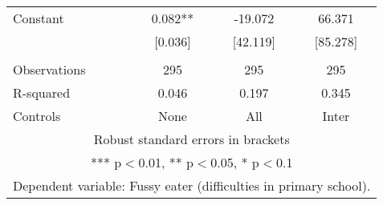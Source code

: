 \begin{tabular}{lccc}
Constant & 0.082** & -19.072 & 66.371 \\
 & [0.036] & [42.119] & [85.278] \\
 &  &  &  \\
Observations & 295 & 295 & 295 \\
R-squared & 0.046 & 0.197 & 0.345 \\
 Controls & None & All & Inter \\ \hline
\multicolumn{4}{c}{ Robust standard errors in brackets} \\
\multicolumn{4}{c}{ *** p$<$0.01, ** p$<$0.05, * p$<$0.1} \\
\multicolumn{4}{c}{ Dependent variable: Fussy eater (difficulties in primary school).} \\
\end{tabular}
